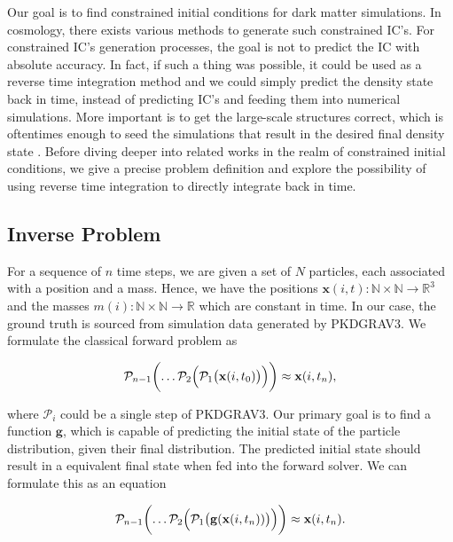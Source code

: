 \documentclass{article}
\begin{document}
Our goal is to find constrained initial conditions for dark matter simulations. In cosmology, there exists various methods  to generate such constrained IC's. For constrained IC's generation processes, the goal is not to predict the IC with absolute accuracy. In fact, if such a thing was possible, it could be used as a reverse time integration method and we could simply predict the density state back in time, instead of predicting IC's and feeding them into numerical simulations. More important is to get the large-scale structures correct, which is oftentimes enough to seed the simulations that result in the desired final density state \citep{jasche2013bayesian}. Before diving deeper into related works in the realm of constrained initial conditions, we give a precise problem definition and explore the possibility of using reverse time integration to directly integrate back in time.

\subsection{Inverse Problem}
For a sequence of $n$ time steps, we are given a set of $N$ particles, each associated with a position and a mass. Hence, we have the positions $\mathbf{x}(i, t) \colon \mathbb{N} \times \mathbb{N} \rightarrow \mathbb{R}^3$ and the masses $m(i) \colon \mathbb{N} \times \mathbb{N} \rightarrow \mathbb{R}$ which are constant in time. In our case, the ground truth is sourced from simulation data generated by PKDGRAV3. We formulate the classical forward problem as

\begin{equation}
    \mathcal{P}_{n-1}\biggl( \dots \mathcal{P}_2\Bigl(\mathcal{P}_1\bigl(\mathbf{x}(i, t_{0})\bigr)\Bigr)\biggr) \approx \mathbf{x}(i, t_{n}),
\end{equation}

where $\mathcal{P}_i$ could be a single step of PKDGRAV3. Our primary goal is to find a function $\mathbf{g}$, which is capable of predicting the initial state of the particle distribution, given their final distribution. The predicted initial state should result in a equivalent final state when fed into the forward solver. We can formulate this as an equation
 
\begin{equation}
    \mathcal{P}_{n-1}\biggl( \dots \mathcal{P}_2\Bigl(\mathcal{P}_1\bigl(\mathbf{g}(\mathbf{x}(i, t_{n}))\bigr)\Bigr)\biggr) \approx \mathbf{x}(i, t_{n}).
\end{equation}
\end{document}
